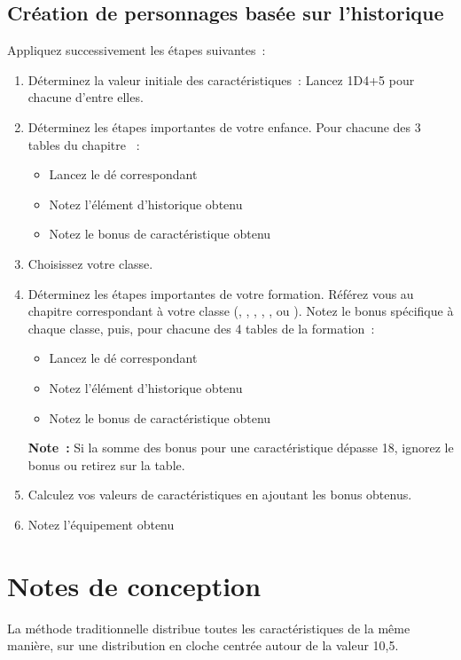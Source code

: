 \subsection{Création de personnages basée sur l'historique}
Appliquez successivement les étapes suivantes~:
\begin{enumerate}
  \item Déterminez la valeur initiale des caractéristiques~:
        Lancez 1D4+5 pour chacune d'entre elles.
  \item Déterminez les étapes importantes de votre enfance.
        Pour chacune des 3 tables du chapitre ~:
        \begin{itemize}
          \item Lancez le dé correspondant
          \item Notez l'élément d'historique obtenu
          \item Notez le bonus de caractéristique obtenu
        \end{itemize}
  \item Choisissez votre classe.
  \item Déterminez les étapes importantes de votre formation.
        Référez vous au chapitre correspondant à votre classe (, , , , ,  ou ).
        Notez le bonus spécifique à chaque classe, puis,
        pour chacune des 4 tables de la formation~:
        \begin{itemize}
          \item Lancez le dé correspondant
          \item Notez l'élément d'historique obtenu
          \item Notez le bonus de caractéristique obtenu
        \end{itemize}
        \textbf{Note~:} Si la somme des bonus pour une caractéristique dépasse 18, ignorez le bonus ou retirez sur la table.
  \item Calculez vos valeurs de caractéristiques en ajoutant les bonus obtenus.
  \item Notez l'équipement obtenu
\end{enumerate}

\ifmulticolEnd
\section*{Notes de conception}
La méthode traditionnelle distribue toutes les caractéristiques de la même manière, sur une distribution en cloche centrée autour de la valeur 10,5.

